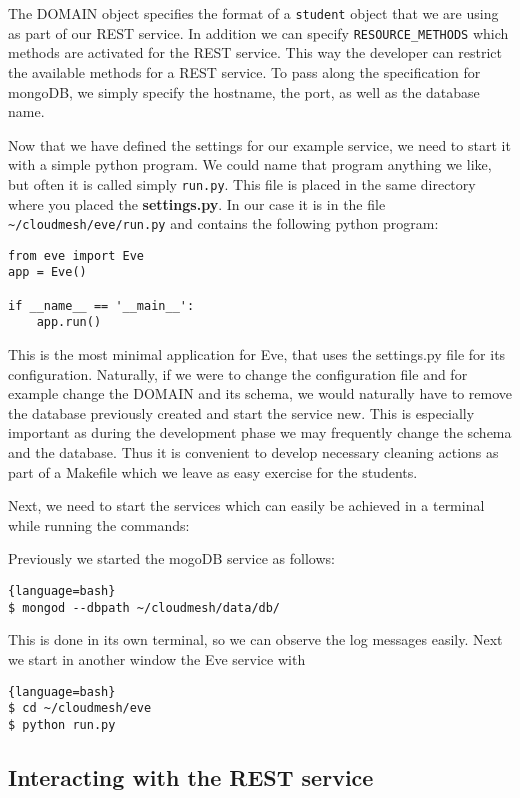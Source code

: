 The DOMAIN object specifies the format of a \verb|student| object that
we are using as part of our REST service.  In addition we can specify
\verb|RESOURCE_METHODS| which methods are activated for the REST
service. This way the developer can restrict the available methods for
a REST service. To pass along the specification for mongoDB, we simply
specify the hostname, the port, as well as the database name.

Now that we have defined the settings for our example service, we need
to start it with a simple python program. We could name that program
anything we like, but often it is called simply \verb|run.py|. This
file is placed in the same directory where you placed the
\textbf{settings.py}. In our case it is in the file
\verb|~/cloudmesh/eve/run.py| and contains the following python
program:

\begin{lstlisting}
from eve import Eve
app = Eve()

if __name__ == '__main__':
    app.run()
\end{lstlisting}

This is the most minimal application for Eve, that uses the
settings.py file for its configuration. Naturally, if we were to
change the configuration file and for example change the DOMAIN and
its schema, we would naturally have to remove the database previously
created and start the service new. This is especially important as
during the development phase we may frequently change the schema and
the database. Thus it is convenient to develop necessary cleaning
actions as part of a Makefile which we leave as easy exercise for the
students.

Next, we need to start the services which can easily be achieved in a
terminal while running the commands:

Previously we started the mogoDB service as follows:

\begin{lstlisting}{language=bash}
$ mongod --dbpath ~/cloudmesh/data/db/
\end{lstlisting}

This is done in its own terminal, so we can observe the log messages easily.
Next we start in another window the Eve service with 

\begin{lstlisting}{language=bash}
$ cd ~/cloudmesh/eve
$ python run.py
\end{lstlisting}


\subsection{Interacting with the REST service}

